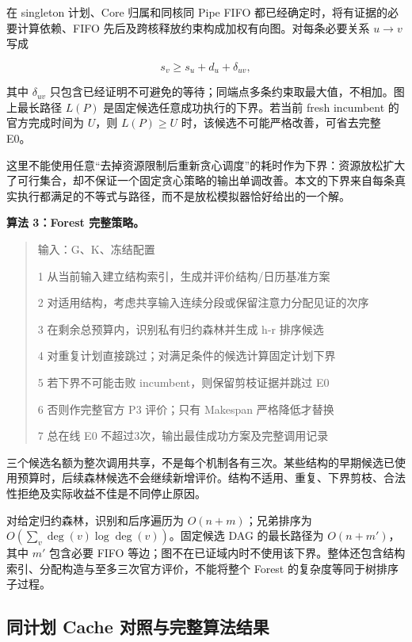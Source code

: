 \documentclass[anonymous,notoc]{gmcm2026}
\begin{document}
在 singleton 计划、Core 归属和同核同 Pipe FIFO 都已经确定时，将有证据的必要计算依赖、FIFO 先后及跨核释放约束构成加权有向图。对每条必要关系 \(u\to v\) 写成

\[s_v\ge s_u+d_u+\delta_{uv},\]

其中 \(\delta_{uv}\) 只包含已经证明不可避免的等待；同端点多条约束取最大值，不相加。图上最长路径 \(L(P)\) 是固定候选任意成功执行的下界。若当前 fresh incumbent 的官方完成时间为 \(U\)，则 \(L(P)\ge U\) 时，该候选不可能严格改善，可省去完整 E0。

这里不能使用任意``去掉资源限制后重新贪心调度''的耗时作为下界：资源放松扩大了可行集合，却不保证一个固定贪心策略的输出单调改善。本文的下界来自每条真实执行都满足的不等式与路径，而不是放松模拟器恰好给出的一个解。

\textbf{算法 3：Forest 完整策略。}

\begin{quote}
输入：G、K、冻结配置

1 从当前输入建立结构索引，生成并评价结构/日历基准方案

2 对适用结构，考虑共享输入连续分段或保留注意力分配见证的次序

3 在剩余总预算内，识别私有归约森林并生成 h-r 排序候选

4 对重复计划直接跳过；对满足条件的候选计算固定计划下界

5 若下界不可能击败 incumbent，则保留剪枝证据并跳过 E0

6 否则作完整官方 P3 评价；只有 Makespan 严格降低才替换

7 总在线 E0 不超过3次，输出最佳成功方案及完整调用记录
\end{quote}

三个候选名额为整次调用共享，不是每个机制各有三次。某些结构的早期候选已使用预算时，后续森林候选不会继续新增评价。结构不适用、重复、下界剪枝、合法性拒绝及实际收益不佳是不同停止原因。

对给定归约森林，识别和后序遍历为 \(O(n+m)\)；兄弟排序为 \(O(\sum_v\deg(v)\log\deg(v))\)。固定候选 DAG 的最长路径为 \(O(n+m')\)，其中 \(m'\) 包含必要 FIFO 等边；图不在已证域内时不使用该下界。整体还包含结构索引、分配构造与至多三次官方评价，不能将整个 Forest 的复杂度等同于树排序子过程。

\subsection{同计划 Cache 对照与完整算法结果}\label{ux540cux8ba1ux5212-cache-ux5bf9ux7167ux4e0eux5b8cux6574ux7b97ux6cd5ux7ed3ux679c}
\end{document}

